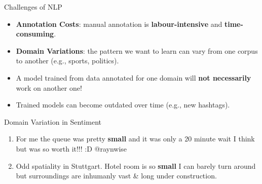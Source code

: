 \documentclass[handout]{beamer}
\begin{document}
\begin{frame}{Challenges of NLP}
\begin{scriptsize}
  \begin{itemize}
   \item \textbf{Annotation Costs}: manual annotation is \textbf{labour-intensive} and \textbf{time-consuming}. 
   \item \textbf{Domain Variations}: the pattern we want to learn can vary from one corpus to another (e.g., sports, politics).
 
 \item A model trained from data annotated for one domain will \textbf{not necessarily} work on another one! 
\item Trained models can become outdated over time (e.g., new hashtags).
  \end{itemize} 



\begin{block}{Domain Variation in Sentiment}
\begin{enumerate}
\item  For me the queue was pretty \textcolor[rgb]{0.00,0.00,1.00}{\textbf{small}} and it was only a 20 minute wait I think but was so worth it!!! :D @raynwise
\item Odd spatiality in Stuttgart. Hotel room is so  \textcolor[rgb]{1.00,0.00,0.00}{\textbf{small}} I can barely turn around but surroundings are inhumanly vast \& long under construction.
\end{enumerate}
\end{block}


\end{scriptsize}

\end{frame}
\end{document}
